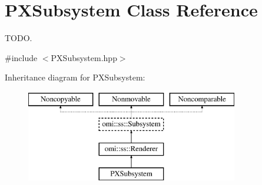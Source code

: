 \hypertarget{class_p_x_subsystem}{}\section{P\+X\+Subsystem Class Reference}
\label{class_p_x_subsystem}


T\+O\+DO.  




{\ttfamily \#include $<$P\+X\+Subsystem.\+hpp$>$}

Inheritance diagram for P\+X\+Subsystem\+:\begin{figure}[H]
\begin{center}
\leavevmode
\includegraphics[height=4.000000cm]{class_p_x_subsystem}
\end{center}
\end{figure}
